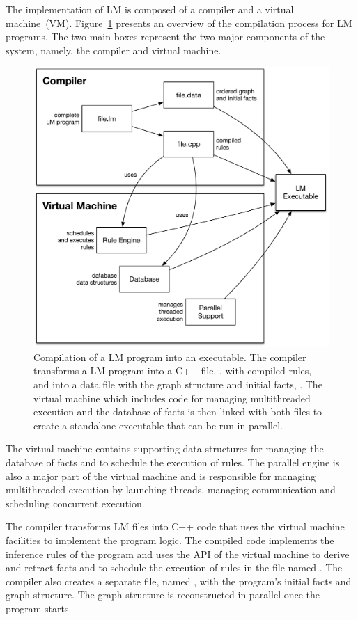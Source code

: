 The implementation of LM is composed of a compiler and a virtual machine~(VM).
Figure~\ref{fig:implementation:overview} presents an overview of the compilation
process for LM programs. The two main boxes represent the two major components
of the system, namely, the compiler and virtual machine.

\begin{figure}[ht]
  \centering
  \includegraphics[width=.75\linewidth]{figures/implementation/overview.pdf}

  \caption{Compilation of a LM program into an executable. The compiler
     transforms a LM program into a C++ file, , with compiled
     rules, and into a data file with the graph structure and initial facts,
     . The virtual machine which includes code for managing
  multithreaded execution and the database of facts is then linked with both
  files to create a standalone executable that can be run in parallel.}

  \label{fig:implementation:overview}
\end{figure}

The virtual machine contains supporting data structures for managing the
database of facts and to schedule the execution of rules. The parallel engine is
also a major part of the virtual machine and is responsible for managing
multithreaded execution by launching threads, managing communication and
scheduling concurrent execution.

The compiler transforms LM files into C++ code that uses the virtual machine
facilities to implement the program logic.  The compiled code implements the
inference rules of the program and uses the API of the virtual machine to derive
and retract facts and to schedule the execution of rules in the file named
. The compiler also creates a separate file, named
, with the program's initial facts and graph structure. The
graph structure is reconstructed in parallel once the program starts.

